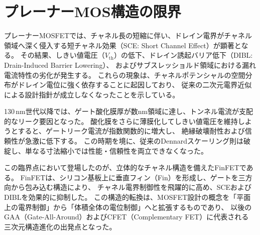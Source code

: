 \section{プレーナーMOS構造の限界}
プレーナーMOSFETでは、チャネル長の短縮に伴い、ドレイン電界がチャネル領域へ深く侵入する短チャネル効果（SCE: Short Channel Effect）が顕著となる。  
その結果、しきい値電圧（$V_{\mathrm{th}}$）の低下、ドレイン誘起バリア低下（DIBL: Drain-Induced Barrier Lowering）、  
およびサブスレッショルド領域における漏れ電流特性の劣化が発生する。  
これらの現象は、チャネルポテンシャルの空間分布がドレイン電位に強く依存することに起因しており、  
従来の二次元電界近似による設計指針が成立しなくなったことを示している。

130\,nm世代以降では、ゲート酸化膜厚が数\si{\nano\meter}領域に達し、トンネル電流が支配的なリーク要因となった。  
酸化膜をさらに薄膜化してしきい値電圧を維持しようとすると、ゲートリーク電流が指数関数的に増大し、  
絶縁破壊耐性および信頼性が急激に低下する。  
この時期を境に、従来のDennardスケーリング則は破綻し、単なる寸法縮小では性能・信頼性を両立できなくなった。

この臨界点において登場したのが、立体的なチャネル構造を備えたFinFETである。  
FinFETは、シリコン基板上に垂直フィン（Fin）を形成し、ゲートを三方向から包み込む構造により、  
チャネル電界制御性を飛躍的に高め、SCEおよびDIBLを効果的に抑制した。  
この構造的転換は、MOSFET設計の概念を「平面上の電界制御」から「体積全体の電位制御」へと拡張するものであり、  
以後のGAA（Gate-All-Around）およびCFET（Complementary FET）に代表される  
三次元構造進化の出発点となった。
